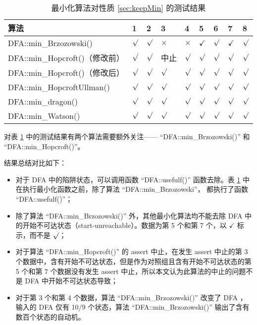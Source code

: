 \begin{table}[!htbp]
    \caption{ 最小化算法对性质 \ref{sec:keepMin} 的测试结果 }
    \label{tab:KeepMinResult}
    \centering
    \small%
    \setlength{\tabcolsep}{4pt}%
    \renewcommand{\arraystretch}{1.2}%
    \begin{tabular}{l|p{2em}<{\centering} p{2em}<{\centering} p{2em}<{\centering} p{2em}<{\centering} p{2em}<{\centering} p{2em}<{\centering} p{2em}<{\centering} p{2em}<{\centering}}  %
        \toprule %
        算法 & 1 & 2 & 3 & 4 &  5 &  6  & 7 & 8  \\
        \midrule
        DFA::min\_Brzozowski()        & $\surd$ & $\surd$ & $\times$  & $\times$  & $\checkmark$ & $\surd$ & $\checkmark$ & $\surd$ \\
        DFA::min\_Hopcroft()（修改前） & $\surd$ & $\surd$ & 中止    & $\surd$     & $\surd$ & $\surd$ & $\surd$ & $\surd$ \\
        DFA::min\_Hopcroft()（修改后） & $\surd$ & $\surd$ & $\surd$ & $\surd$     & $\surd$ & $\surd$ & $\surd$ & $\surd$ \\
        DFA::min\_HopcroftUllman()    & $\surd$ & $\surd$ & $\surd$ & $\surd$     & $\surd$ & $\surd$ & $\surd$ & $\surd$ \\
        DFA::min\_dragon()            & $\surd$ & $\surd$ & $\surd$ & $\surd$     & $\surd$ & $\surd$ & $\surd$ & $\surd$ \\
        DFA::min\_Watson()            & $\surd$ & $\surd$ & $\surd$ & $\surd$     & $\surd$ & $\surd$ & $\surd$ & $\surd$ \\
        \bottomrule%
    \end{tabular}
\end{table}

对表 \ref{tab:KeepMinResult} 中的测试结果有两个算法需要额外关注—— “DFA::min\_Brzozowski()” 和 “DFA::min\_Hopcroft()”。

结果总结对比如下：
\begin{itemize}
    \item 对于 DFA 中的陷阱状态，可以调用函数 “DFA::usefulf()” 函数去除。表 \ref{tab:KeepMinResult} 中在执行最小化函数之前，除了算法 “DFA::min\_Brzozowski”， 都执行了函数 “DFA::usefulf()”；
    \item 除了算法 “DFA::min\_Brzozowski()” 外，其他最小化算法均不能去除 DFA 中的开始不可达状态（start-unreachable）。数据为第 5 个和第 7 个，以 $\checkmark$ 标示，而不是 $\surd$；
    \item 对于算法 “DFA::min\_Hopcroft()” 的 assert 中止，在发生 assert 中止的第 3 个数据中，含有开始不可达状态，但是作为对照组且含有开始不可达状态的第 5 个和第 7 个数据没有发生 assert 中止，所以本文认为此算法的中止的问题不是 DFA 中开始不可达状态导致；
    \item 对于第 3 个和第 4 个数据，算法 “DFA::min\_Brzozowski()” 改变了 DFA ，输入的 DFA 仅有 10/9 个状态，算法 “DFA::min\_Brzozowski()” 输出了含有数百个状态的自动机。
\end{itemize}



